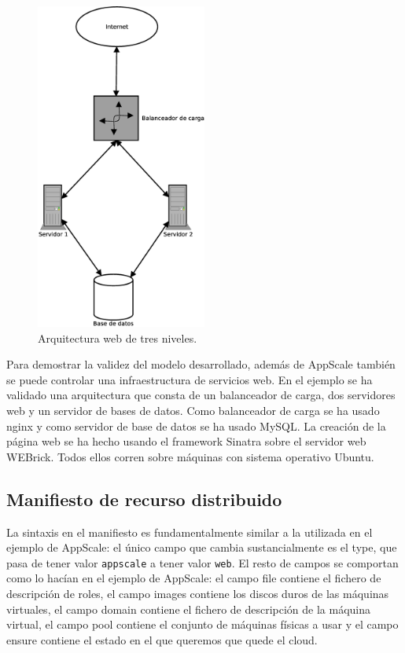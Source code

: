 \begin{figure} [!htbp]
  \centering
  \includegraphics[width=0.5\textwidth]{figuras/Arquitectura_web2.eps}
  \caption{Arquitectura web de tres niveles.}
\label{figure:arquitectura-web}
\end{figure}

Para demostrar la validez del modelo desarrollado, además de AppScale también se puede controlar una infraestructura de servicios web. En el ejemplo se ha validado una arquitectura que consta de un balanceador de carga, dos servidores web y un servidor de bases de datos. Como balanceador de carga se ha usado nginx y como servidor de base de datos se ha usado MySQL. La creación de la página web se ha hecho usando el framework Sinatra sobre el servidor web WEBrick. Todos ellos corren sobre máquinas con sistema operativo Ubuntu.\\

\subsection{Manifiesto de recurso distribuido}

La sintaxis en el manifiesto es fundamentalmente similar a la utilizada en el ejemplo de AppScale: el único campo que cambia sustancialmente es el type, que pasa de tener valor \texttt{appscale} a tener valor \texttt{web}. El resto de campos se comportan como lo hacían en el ejemplo de AppScale: el campo file contiene el fichero de descripción de roles, el campo images contiene los discos duros de las máquinas virtuales, el campo domain contiene el fichero de descripción de la máquina virtual, el campo pool contiene el conjunto de máquinas físicas a usar y el campo ensure contiene el estado en el que queremos que quede el cloud.

